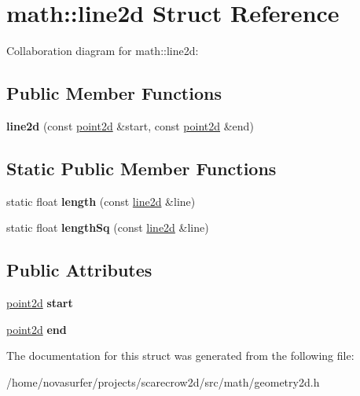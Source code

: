 \hypertarget{structmath_1_1line2d}{}\section{math\+:\+:line2d Struct Reference}
\label{structmath_1_1line2d}


Collaboration diagram for math\+:\+:line2d\+:
\subsection*{Public Member Functions}
\begin{DoxyCompactItemize}
\item 
\mbox{\label{structmath_1_1line2d_a4eaaf4a8a562677c42c7d1cc1ad29c8c}} 
{\bfseries line2d} (const \hyperlink{structmath_1_1vec2}{point2d} \&start, const \hyperlink{structmath_1_1vec2}{point2d} \&end)
\end{DoxyCompactItemize}
\subsection*{Static Public Member Functions}
\begin{DoxyCompactItemize}
\item 
\mbox{\label{structmath_1_1line2d_a498c090527b3893a09b81e86d2fb557a}} 
static float {\bfseries length} (const \hyperlink{structmath_1_1line2d}{line2d} \&line)
\item 
\mbox{\label{structmath_1_1line2d_a58663b6af5156f03f92257fd7539e2d3}} 
static float {\bfseries length\+Sq} (const \hyperlink{structmath_1_1line2d}{line2d} \&line)
\end{DoxyCompactItemize}
\subsection*{Public Attributes}
\begin{DoxyCompactItemize}
\item 
\mbox{\label{structmath_1_1line2d_a91eedde3ad982f8d894512b16e1c26fd}} 
\hyperlink{structmath_1_1vec2}{point2d} {\bfseries start}
\item 
\mbox{\label{structmath_1_1line2d_add697c10964ede05b9ce24786c686fd1}} 
\hyperlink{structmath_1_1vec2}{point2d} {\bfseries end}
\end{DoxyCompactItemize}


The documentation for this struct was generated from the following file\+:\begin{DoxyCompactItemize}
\item 
/home/novasurfer/projects/scarecrow2d/src/math/geometry2d.\+h\end{DoxyCompactItemize}
